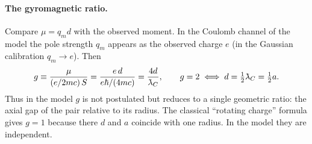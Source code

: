 \documentclass[12pt,a4paper]{article}
\providecommand{\lambdabar}{{\mkern0.75mu\mathchar'26\mkern-9.75mu\lambda}}
\begin{document}
\paragraph{The gyromagnetic ratio.} Compare $\mu=q_md$ with the observed moment. In
the Coulomb channel of the model the pole strength $q_m$ appears as the observed
charge $e$ (in the Gaussian calibration $q_m\to e$). Then
\begin{equation}
g\equiv\frac{\mu}{(e/2mc)\,S}=\frac{e\,d}{e\hbar/(4mc)}=\frac{4d}{\lambdabar_C},
\qquad
g=2\iff d=\tfrac12\lambdabar_C=\tfrac12a .
\label{eq:g_geometry}
\end{equation}
Thus in the model $g$ is not postulated but reduces to a single geometric ratio: the
axial gap of the pair relative to its radius. The classical ``rotating charge''
formula gives $g=1$ because there $d$ and $a$ coincide with one radius. In the model
they are independent.
\end{document}
